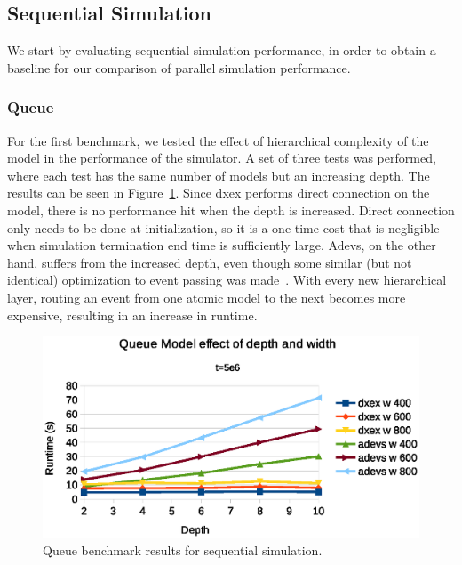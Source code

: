 \subsection{Sequential Simulation}
We start by evaluating sequential simulation performance, in order to obtain a baseline for our comparison of parallel simulation performance.

\subsubsection{Queue}
\label{4-seq-Queue}
For the first benchmark, we tested the effect of hierarchical complexity of the model in the performance of the simulator.
A set of three tests was performed, where each test has the same number of models but an increasing depth.
The results can be seen in Figure~\ref{fig:Queue_benchmark_seq}.
Since dxex performs direct connection on the model, there is no performance hit when the depth is increased.
Direct connection only needs to be done at initialization, so it is a one time cost that is negligible when simulation termination end time is sufficiently large.
Adevs, on the other hand, suffers from the increased depth, even though some similar (but not identical) optimization to event passing was made~\cite{adevs_opt}.
With every new hierarchical layer, routing an event from one atomic model to the next becomes more expensive, resulting in an increase in runtime.
\begin{figure}
	\center
	\includegraphics[width=\columnwidth]{fig/queue_fixed_sequential.eps}
	\caption{Queue benchmark results for sequential simulation.}
	\label{fig:Queue_benchmark_seq}
\end{figure}

